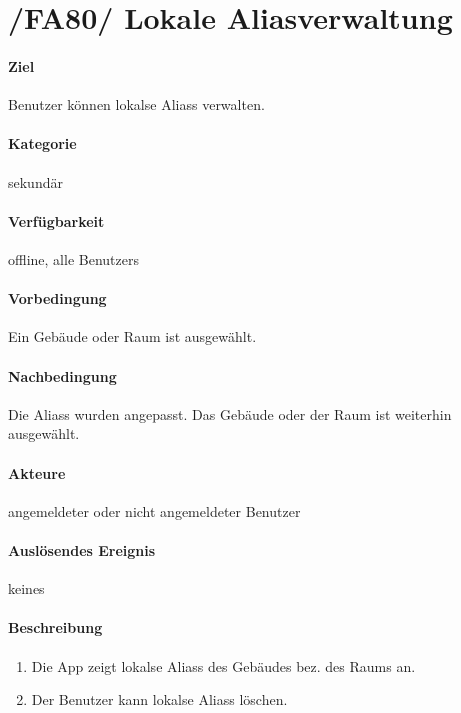 \section{/FA80/ Lokale Aliasverwaltung}
\label{Lokale_Aliasverwaltung}
\label{/FA80/}
\paragraph{Ziel}
\Gls{Benutzer} können \glspl{lokal}e \Glspl{Alias} verwalten.
\paragraph{Kategorie}
sekundär
\paragraph{Verfügbarkeit}
offline, alle \Glspl{Benutzer}
\paragraph{Vorbedingung}
Ein Gebäude oder Raum ist ausgewählt.
\paragraph{Nachbedingung}
Die \Glspl{Alias} wurden angepasst. Das Gebäude oder der Raum ist weiterhin ausgewählt.
\paragraph{Akteure}
angemeldeter oder nicht angemeldeter \Gls{Benutzer}
\paragraph{Auslösendes Ereignis} keines
\paragraph{Beschreibung}
\begin{enumerate}
      \item Die App zeigt \glspl{lokal}e \Glspl{Alias} des Gebäudes bez. des Raums an.
      \item Der \Gls{Benutzer} kann \glspl{lokal}e \Glspl{Alias} löschen.
\end{enumerate}